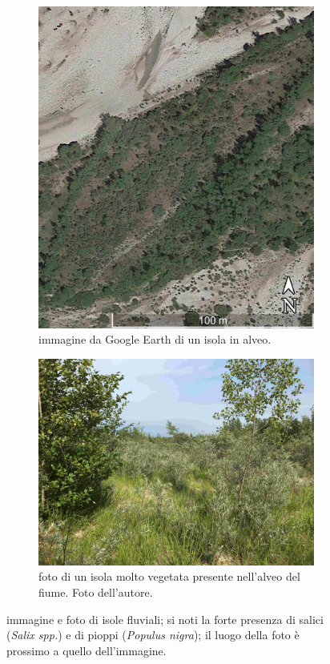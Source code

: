 \begin{figure}
	\centering
	\begin{subfigure}[b]{0.37\textwidth}
		\includegraphics[width=\textwidth]{files/esempio_isola_sat_1.jpg}
		\caption{immagine da Google Earth di un isola in alveo.}
		\label{fig:esempio-isola-sat-1}
	\end{subfigure}
	\quad
	\begin{subfigure}[b]{0.57\textwidth}
		\includegraphics[width=\textwidth]{files/esempio_isola_1.jpg}
		\caption{foto di un isola molto vegetata presente nell'alveo del fiume.
		Foto dell'autore.}
		\label{fig:esempio-isola-1}
	\end{subfigure}
	\caption[immagine e foto di isole fluviali]{immagine e foto di isole fluviali; si noti la forte presenza di salici (\emph{Salix spp.}) e di pioppi (\emph{Populus nigra}); il luogo della foto è prossimo a quello dell'immagine.}
	\label{fig:esempio-isola}
\end{figure}

